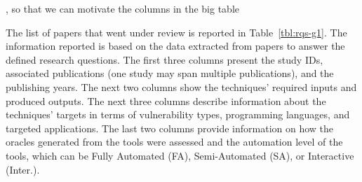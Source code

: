 {}
{, so that we can motivate the columns in the big table}

The list of papers that went under review is reported in Table~\ref{tbl:rqs-g1}.
The information reported is based on the data extracted from papers to answer the defined research questions. 
%
The first three columns present the study IDs, associated publications (one study may span multiple publications), and the publishing years.
The next two columns show the techniques' required inputs and produced outputs. The next three columns describe information about the techniques' targets in terms of vulnerability types, programming languages, and targeted applications. The last two columns provide information on how the oracles generated from the tools were assessed and the automation level of the tools, which can be Fully Automated (FA), Semi-Automated (SA), or Interactive (Inter.).


